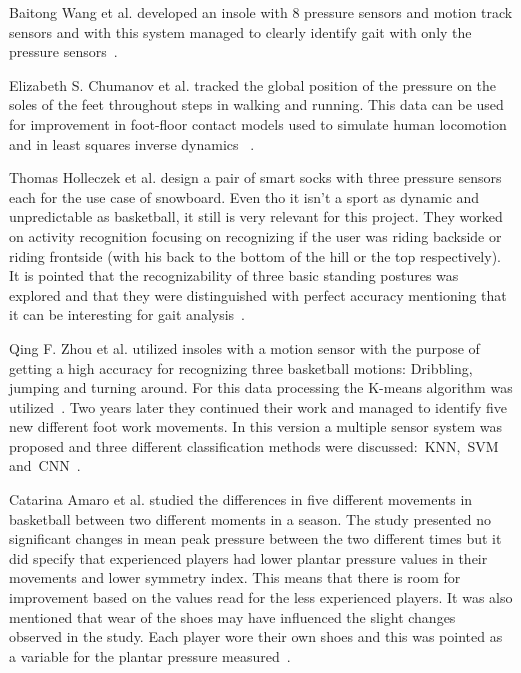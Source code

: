 Baitong Wang et al. developed an insole with 8 pressure sensors and motion track sensors and with this system managed to clearly identify 
gait with only the pressure sensors~\cite{freewalker}.

Elizabeth S. Chumanov et al. tracked the global position of the pressure on the soles of the feet throughout steps in walking and running. 
This data can be used for improvement in foot-floor contact models used to simulate human locomotion and in least squares inverse dynamics
~\cite{posDuringWalking}. 

Thomas Holleczek et al. design a pair of smart socks with three pressure sensors each for the use case of snowboard. Even tho it isn't a 
sport as dynamic and unpredictable as basketball, it still is very relevant for this project. They worked on activity recognition focusing 
on recognizing if the user was riding backside or riding frontside (with his back to the bottom of the hill or the top respectively). It is 
pointed that the recognizability of three basic standing postures was explored and that they were distinguished with perfect accuracy 
mentioning that it can be interesting for gait analysis~\cite{snowboard}. 

Qing F. Zhou et al. utilized insoles with a motion sensor with the purpose of getting a high accuracy for recognizing three basketball 
motions: Dribbling, jumping and turning around. For this data processing the K-means algorithm was utilized~\cite{basketballMotions}. Two years later they 
continued their work and managed to identify five new different foot work movements. In this version a multiple sensor system was proposed 
and three different classification methods were discussed:~\gls{KNN},~\gls{SVM} and~\gls{CNN}~\cite{basketballFootwork}. 

Catarina Amaro et al. studied the differences in five different movements in basketball between two different moments in a season. The 
study presented no significant changes in mean peak pressure between the two different times but it did specify that experienced players 
had lower plantar pressure values in their movements and lower symmetry index. This means that there is room for improvement based on the 
values read for the less experienced players. It was also mentioned that wear of the shoes may have influenced the slight changes observed 
in the study. Each player wore their own shoes and this was pointed as a variable for the plantar pressure measured~\cite{coimbra}.

\newpage


